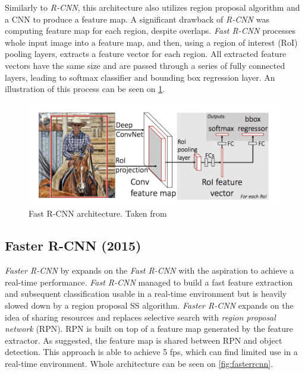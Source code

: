 Similarly to \textit{R-CNN}, this architecture also utilizes region proposal algorithm and a CNN to produce a feature map. A significant drawback of \textit{R-CNN} was computing feature map for each region, despite overlaps. \textit{Fast R-CNN} processes whole input image into a feature map, and then, using a region of interest (RoI) pooling layers, extracts a feature vector for each region. All extracted feature vectors have the same size and are passed through a series of fully connected layers, leading to softmax classifier and bounding box regression layer. An illustration of this process can be seen on \cref{fig:fastrcnn}.

\begin{figure}
    \centering
    \includegraphics[width=\textwidth]{img/fastrcnn}
    \caption{Fast R-CNN architecture. Taken from \cite[fig. 1]{bib:fastrcnn}}
    \label{fig:fastrcnn}
\end{figure}

\subsection{Faster R-CNN (2015)}
 
 \textit{Faster R-CNN} by \citeauthor{bib:fasterrcnn} \cite{bib:fasterrcnn} expands on the \textit{Fast R-CNN} with the aspiration to achieve a real-time performance. \textit{Fast R-CNN} managed to build a fast feature extraction and subsequent classification usable in a real-time environment but is heavily slowed down by a region proposal SS algorithm. \textit{Faster R-CNN} expands on the idea of sharing resources and replaces selective search with \textit{region proposal network} (RPN). RPN is built on top of a feature map generated by the feature extractor. As suggested, the feature map is shared between RPN and object detection. This approach is able to achieve 5 fps, which can find limited use in a real-time environment. Whole architecture can be seen on \cref{fig:fasterrcnn}. 
 
